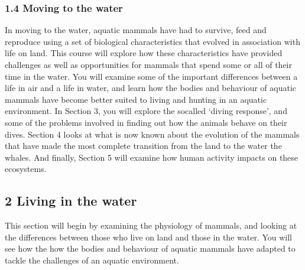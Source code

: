 \documentclass[letterpaper,10pt,english]{sphinxmanual}
\begin{document}
\subsubsection{1.4 Moving to the water}
\label{\detokenize{content/session_00/Part_00_01:1.4-Moving-to-the-water}}
In moving to the water, aquatic mammals have had to survive, feed and reproduce using a set of biological characteristics that evolved in association with life on land. This course will explore how these characteristics have provided challenges \textendash{} as well as opportunities \textendash{} for mammals that spend some or all of their time in the water. You will examine some of the important differences between a life in air and a life in water, and learn how the bodies and behaviour of aquatic mammals have become
better suited to living and hunting in an aquatic environment. In Section 3, you will explore the so\sphinxhyphen{}called ‘diving response’, and some of the problems involved in finding out how the animals behave on their dives. Section 4 looks at what is now known about the evolution of the mammals that have made the most complete transition from the land to the water \textendash{} the whales. And finally, Section 5 will examine how human activity impacts on these ecosystems.


\subsection{2 Living in the water}
\label{\detokenize{content/session_00/Part_00_02:2-Living-in-the-water}}\label{\detokenize{content/session_00/Part_00_02::doc}}
This section will begin by examining the physiology of mammals, and looking at the differences between those who live on land and those in the water. You will see how the how the bodies and behaviour of aquatic mammals have adapted to tackle the challenges of an aquatic environment.
\end{document}
